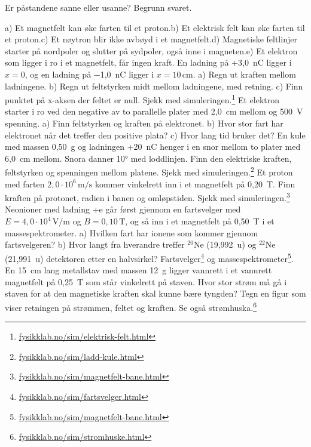 \documentclass[11pt]{article}
\begin{document}
\begin{oppgaveliste}
\oppgave {}Er påstandene sanne eller usanne? Begrunn svaret.

a) Et magnetfelt kan øke farten til et proton.\newline b) Et elektrisk felt kan øke farten til et proton.\newline c) Et nøytron blir ikke avbøyd i et magnetfelt.\newline d) Magnetiske feltlinjer starter på nordpoler og slutter på sydpoler, også inne i magneten.\newline e) Et elektron som ligger i ro i et magnetfelt, får ingen kraft.
\svar
\oppgave {}En ladning på +3,0~nC ligger i $x = 0$, og en ladning på −1,0~nC ligger i $x = 10\,\mathrm{cm}$. a) Regn ut kraften mellom ladningene. b) Regn ut feltstyrken midt mellom ladningene, med retning. c) Finn punktet på x-aksen der feltet er null. Sjekk med simuleringen.\footnote{\url{fysikklab.no/sim/elektrisk-felt.html}}
\svar
\oppgave {}Et elektron starter i ro ved den negative av to parallelle plater med 2,0~cm mellom og 500~V spenning. a) Finn feltstyrken og kraften på elektronet. b) Hvor stor fart har elektronet når det treffer den positive plata? c) Hvor lang tid bruker det?
\svar
\oppgave {}En kule med massen 0,50~g og ladningen +20~nC henger i en snor mellom to plater med 6,0~cm mellom. Snora danner 10° med loddlinjen. Finn den elektriske kraften, feltstyrken og spenningen mellom platene. Sjekk med simuleringen.\footnote{\url{fysikklab.no/sim/ladd-kule.html}}
\svar
\oppgave {}Et proton med farten $2{,}0 \cdot 10^{6}\,\mathrm{m/s}$ kommer vinkelrett inn i et magnetfelt på 0,20~T. Finn kraften på protonet, radien i banen og omløpstiden. Sjekk med simuleringen.\footnote{\url{fysikklab.no/sim/magnetfelt-bane.html}}
\svar
\oppgave {}Neonioner med ladning +e går først gjennom en fartsvelger med $E = 4{,}0 \cdot 10^{4}\,\mathrm{V/m}$ og $B = 0{,}10\,\mathrm{T}$, og så inn i et magnetfelt på 0,50~T i et massespektrometer. a) Hvilken fart har ionene som kommer gjennom fartsvelgeren? b) Hvor langt fra hverandre treffer ${}^{20}\mathrm{Ne}$ (19,992~u) og ${}^{22}\mathrm{Ne}$ (21,991~u) detektoren etter en halvsirkel? Fartsvelger\footnote{\url{fysikklab.no/sim/fartsvelger.html}} og massespektrometer\footnote{\url{fysikklab.no/sim/magnetfelt-bane.html}}.
\svar
\oppgave {}En 15~cm lang metallstav med massen 12~g ligger vannrett i et vannrett magnetfelt på 0,25~T som står vinkelrett på staven. Hvor stor strøm må gå i staven for at den magnetiske kraften skal kunne bære tyngden? Tegn en figur som viser retningen på strømmen, feltet og kraften. Se også strømhuska.\footnote{\url{fysikklab.no/sim/stromhuske.html}}

\end{oppgaveliste}
\end{document}
